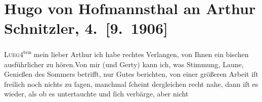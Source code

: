 

         
         \renewcommand{\erwaehntePersonen}{Personen: Otto Brahm, Hugo von Hofmannsthal, Gertrude von Hofmannsthal, Raimund von Hofmannsthal, Franz von Hofmannsthal, Christiane Zimmer}
         \renewcommand{\erwaehnteOrte}{Orte: Lueg am Wolfgangsee, Rodaun, Semmering, St. Gilgen, Wien}
         \renewcommand{\erwaehnteWerke}{}
               \section[Hugo von Hofmannsthal an Arthur Schnitzler, 4. {[}9. 1906{]}]{ Hugo von Hofmannsthal an Arthur Schnitzler, 4. {[}9. 1906{]}}\nopagebreak{}\rehead{ }\begin{ledgroupsized}[t]{13cm}\normalsize\beginnumbering{} \toendnotes[C]{\smallbreak\pagebreak[2]} 
\toendnotes[C]{\smallbreak}\pstart
           \raggedleft{}{\pb}\textsc{Lueg}4\textsuperscript{ten}\pend
           \pstart{}mein lieber Arthur \pend\pstart
           ich habe rechtes Verlangen, von Ihnen ein bischen ausführlicher zu hören.\hspace*{1.5em}Von mir (und Gerty) kann ich, was Stimmung, Laune, Genießen des Sommers betrifft, nur
               Gutes berichten, von einer größeren Arbeit iſt freilich noch nichts zu ſagen,
               manchmal {\pb}ſcheint dergleichen
               recht nahe, dann iſt es wieder, als ob es untertauchte und ſich verbärge, aber nicht

\end{ledgroupsized}
